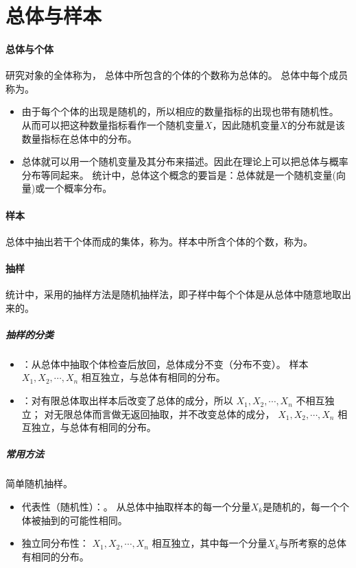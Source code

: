 \section{总体与样本}

\paragraph{总体与个体} 研究对象的全体称为，
总体中所包含的个体的个数称为总体的。
总体中每个成员称为。

\begin{itemize}[leftmargin=\paritemindent]
    \item 由于每个个体的出现是随机的，所以相应的数量指标的出现也带有随机性。
    从而可以把这种数量指标看作一个随机变量$ X $，因此随机变量$ X $的分布就是该数量指标在总体中的分布。
    \item 总体就可以用一个随机变量及其分布来描述。因此在理论上可以把总体与概率分布等同起来。
    统计中，总体这个概念的要旨是：总体就是一个随机变量(向量)或一个概率分布。
\end{itemize}

\paragraph{样本} 
总体中抽出若干个体而成的集体，称为。样本中所含个体的个数，称为。

\paragraph{抽样} 统计中，采用的抽样方法是随机抽样法，即子样中每个个体是从总体中随意地取出来的。
\subparagraph{抽样的分类} 
\begin{itemize}[leftmargin=\subparitemindent]
    \item {}：从总体中抽取个体检查后放回，总体成分不变（分布不变）。
    样本 $ X_1, X_2, \cdots, X_n $ 相互独立，与总体有相同的分布。
    \item {}：对有限总体取出样本后改变了总体的成分，所以 $ X_1, X_2, \cdots, X_n $ 不相互独立；
    对无限总体而言做无返回抽取，并不改变总体的成分， $ X_1, X_2, \cdots, X_n $ 相互独立，与总体有相同的分布。
\end{itemize}

\subparagraph{常用方法} 简单随机抽样。
\begin{itemize}[leftmargin=\subparitemindent]
    \item 代表性（随机性）：。 从总体中抽取样本的每一个分量$ X_k $是随机的，每一个个体被抽到的可能性相同。
    \item 独立同分布性： $ X_1, X_2, \cdots, X_n $ 相互独立，其中每一个分量$ X_k $与所考察的总体有相同的分布。
\end{itemize}

